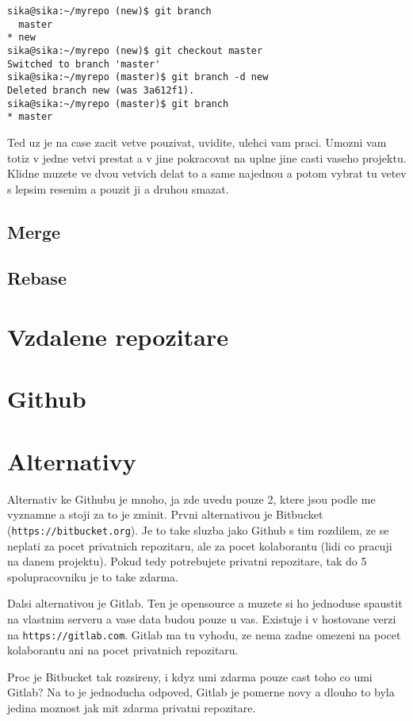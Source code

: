 \documentclass[12pt,a5paper]{article}
\begin{document}
\begin{lstlisting}
sika@sika:~/myrepo (new)$ git branch
  master
* new
sika@sika:~/myrepo (new)$ git checkout master
Switched to branch 'master'
sika@sika:~/myrepo (master)$ git branch -d new
Deleted branch new (was 3a612f1).
sika@sika:~/myrepo (master)$ git branch
* master
\end{lstlisting}

Ted uz je na case zacit vetve pouzivat, uvidite, ulehci vam praci. Umozni vam totiz v jedne vetvi prestat a v jine pokracovat na uplne jine casti vaseho projektu. Klidne muzete ve dvou vetvich delat to a same najednou a potom vybrat tu vetev s lepsim resenim a pouzit ji a druhou smazat.


\subsection{Merge}
\subsection{Rebase}
\section{Vzdalene repozitare}
\section{Github}
\section{Alternativy}

Alternativ ke Githubu je mnoho, ja zde uvedu pouze 2, ktere jsou podle me vyznamne a stoji za to je zminit. Prvni alternativou je Bitbucket (\lstinline|https://bitbucket.org|). Je to take sluzba jako Github s tim rozdilem, ze se neplati za pocet privatnich repozitaru, ale za pocet kolaborantu (lidi co pracuji na danem projektu). Pokud tedy potrebujete privatni repozitare, tak do 5 spolupracovniku je to take zdarma.

Dalsi alternativou je Gitlab. Ten je opensource a muzete si ho jednoduse spaustit na vlastnim serveru a vase data budou pouze u vas. Existuje i v hostovane verzi na \lstinline|https://gitlab.com|. Gitlab ma tu vyhodu, ze nema zadne omezeni na pocet kolaborantu ani na pocet privatnich repozitaru.

Proc je Bitbucket tak rozsireny, i kdyz umi zdarma pouze cast toho co umi Gitlab? Na to je jednoducha odpoved, Gitlab je pomerne novy a dlouho to byla jedina moznost jak mit zdarma privatni repozitare.
\end{document}
